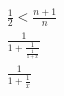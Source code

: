 \begin{align*}
    \frac{1}{2} < \frac{n+1}{n} \\
    \frac{1}{1 + \frac{1}{\frac{1}{1+x}}} \\
    \frac{1}{\displaystyle 1 + \frac{1}{x}}
\end{align*}
